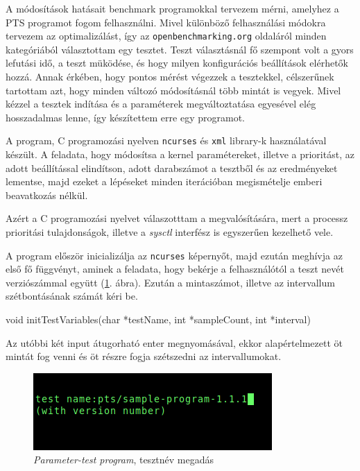 A módosítások hatásait benchmark programokkal tervezem mérni, amelyhez a PTS programot fogom felhasználni. Mivel különböző felhasználási módokra tervezem az optimalizálást, így az \texttt{openbenchmarking.org} oldaláról minden kategóriából választottam egy tesztet. 
Teszt választásnál fő szempont volt a gyors lefutási idő, a teszt müködése, és hogy milyen konfigurációs beállítások elérhetők hozzá. Annak érkében, hogy pontos mérést végezzek a tesztekkel, célszerűnek tartottam azt, hogy minden változó módosításnál több mintát is vegyek.
Mivel kézzel a tesztek indítása és a paraméterek megváltoztatása egyesével elég hosszadalmas lenne, így készítettem erre egy programot.


A program, C programozási nyelven \texttt{ncurses} és \texttt{xml} library-k használatával készült.
A feladata, hogy módosítsa a kernel paramétereket, illetve a prioritást, az adott beállítással elindítson, adott darabszámot a tesztből és az eredményeket lementse, majd ezeket a lépéseket minden iterációban megismételje emberi beavatkozás nélkül.

Azért a C programozási nyelvet válaszotttam a megvalósítására, mert a processz prioritási tulajdonságok, illetve a \textit{sysctl} interfész is egyszerűen kezelhető vele.


A program először inicializálja az \texttt{ncurses} képernyőt, majd ezután meghívja az első fő függvényt, aminek a feladata, hogy bekérje a felhasználótól a teszt nevét verziószámmal együtt (\ref{fig:parameter-testInit}. ábra). Ezután a mintaszámot, illetve az intervallum szétbontásának számát kéri be.  

\begin{cpp}
void initTestVariables(char *testName, int *sampleCount, int *interval)
\end{cpp}

Az utóbbi két input átugorható enter megnyomásával, ekkor alapértelmezett öt mintát fog venni és öt részre fogja szétszedni az intervallumokat.

\begin{figure}[h!]
\centering
\includegraphics[scale=3.0]{images/parameter-testInit.png}
\caption{\textit{Parameter-test program}, tesztnév megadás}
\label{fig:parameter-testInit}
\end{figure}

